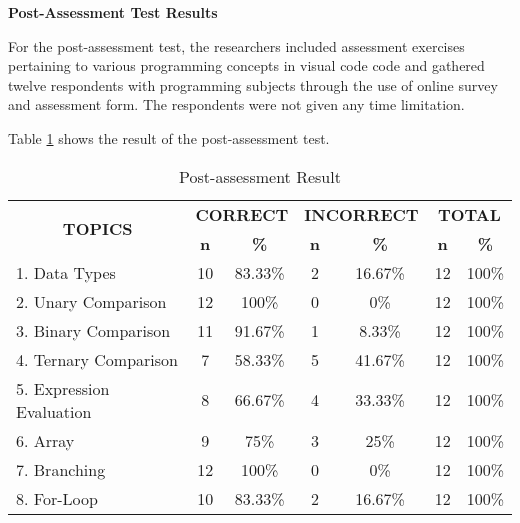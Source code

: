 \flushleft
\textbf{Post-Assessment Test Results}
\justifying

\parx
For the post-assessment test, the researchers included assessment exercises
pertaining to various programming concepts in visual code code and gathered
twelve respondents with programming subjects through the use of online survey
and assessment form. The respondents were not given any time limitation.

\parx
Table \ref{table:post_result} shows the result of the post-assessment test.

\begin{longtable}[c]{lcccccc}
\caption{Post-assessment Result}
\label{table:post_result}\\ \hline
\multicolumn{1}{c}{\multirow{2}{*}{\textbf{TOPICS}}} & \multicolumn{2}{c}{\textbf{CORRECT}} & \multicolumn{2}{c}{\textbf{INCORRECT}} & \multicolumn{2}{c}{\textbf{TOTAL}} \\
\multicolumn{1}{c}{}                                 & \textbf{n}       & \textbf{\%}       & \textbf{n}        & \textbf{\%}        & \textbf{n}      & \textbf{\%}      \\ \hline
\endfirsthead
%
\endhead
%
1. Data Types                                        & 10               & 83.33\%           & 2                 & 16.67\%            & 12              & 100\%            \\
2. Unary Comparison                                  & 12               & 100\%             & 0                 & 0\%                & 12              & 100\%            \\
3. Binary Comparison                                 & 11               & 91.67\%           & 1                 & 8.33\%             & 12              & 100\%            \\
4. Ternary Comparison                                & 7                & 58.33\%           & 5                 & 41.67\%            & 12              & 100\%            \\
5. Expression Evaluation                             & 8                & 66.67\%           & 4                 & 33.33\%            & 12              & 100\%            \\
6. Array                                             & 9                & 75\%              & 3                 & 25\%               & 12              & 100\%            \\
7. Branching                                         & 12               & 100\%             & 0                 & 0\%                & 12              & 100\%            \\
8. For-Loop                                         & 10               & 83.33\%           & 2                 & 16.67\%            & 12              & 100\%           \\ \hline
\end{longtable}

